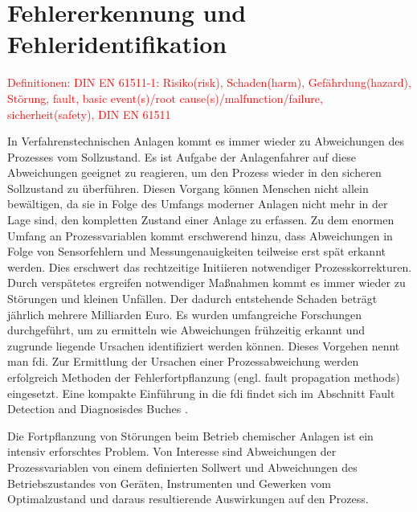 \section{Fehlererkennung und Fehleridentifikation}\label{sec:fAna_fdi}
\textcolor{red}{Definitionen: DIN EN 61511-1: Risiko(risk), Schaden(harm), Gef\"ahrdung(hazard), St\"orung, fault, basic event(s)/root cause(s)/malfunction/failure, sicherheit(safety), DIN EN 61511 }

In Verfahrenstechnischen Anlagen kommt es immer wieder zu Abweichungen des Prozesses vom Sollzustand. Es ist Aufgabe der Anlagenfahrer auf diese Abweichungen geeignet zu reagieren, um den Prozess wieder in den sicheren Sollzustand zu \"uberf\"uhren. Diesen Vorgang k\"onnen Menschen nicht allein bew\"altigen, da sie in Folge des Umfangs moderner Anlagen nicht mehr in der Lage sind, den kompletten Zustand einer Anlage zu erfassen. Zu dem enormen Umfang an Prozessvariablen kommt erschwerend hinzu, dass Abweichungen in Folge von Sensorfehlern und Messungenauigkeiten teilweise erst sp\"at erkannt werden. Dies erschwert das rechtzeitige Initiieren notwendiger Prozesskorrekturen. Durch versp\"atetes ergreifen notwendiger Ma\ss{}nahmen kommt es immer wieder zu St\"orungen und kleinen Unf\"allen. Der dadurch entstehende Schaden betr\"agt j\"ahrlich mehrere Milliarden Euro. Es wurden umfangreiche Forschungen durchgef\"uhrt, um zu ermitteln wie Abweichungen fr\"uhzeitig erkannt und zugrunde liegende Ursachen identifiziert werden k\"onnen. Dieses Vorgehen nennt man \acf{fdi}. Zur Ermittlung der Ursachen einer Prozessabweichung werden erfolgreich Methoden der Fehlerfortpflanzung (engl. fault propagation methods) eingesetzt.  \cite[S. 2]{Venkatasubramanian_2003} \newline
Eine kompakte Einf\"uhrung in die \ac{fdi} findet sich im Abschnitt \glqq Fault Detection and Diagnosis\grqq { }des Buches  \cite[S. 417 ff.]{Baillieul_2015}.

Die Fortpflanzung von St\"orungen beim Betrieb chemischer Anlagen ist ein intensiv erforschtes Problem. Von Interesse sind Abweichungen der Prozessvariablen von einem definierten Sollwert und Abweichungen des Betriebszustandes von Ger\"aten, Instrumenten und Gewerken vom Optimalzustand und daraus resultierende Auswirkungen auf den Prozess.

